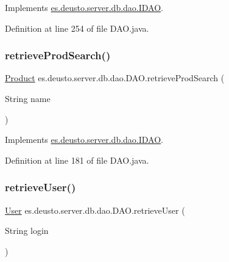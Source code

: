 Implements \hyperlink{interfacees_1_1deusto_1_1server_1_1db_1_1dao_1_1_i_d_a_o_a1386c2e329277fc36575b0450a0e8997}{es.\+deusto.\+server.\+db.\+dao.\+I\+D\+AO}.



Definition at line 254 of file D\+A\+O.\+java.

\mbox{\label{classes_1_1deusto_1_1server_1_1db_1_1dao_1_1_d_a_o_a5b4aa30073fdf9ea4263a86165ed4c18}} 
\subsubsection{\texorpdfstring{retrieve\+Prod\+Search()}{retrieveProdSearch()}}
{\footnotesize\ttfamily \hyperlink{classes_1_1deusto_1_1server_1_1db_1_1data_1_1_product}{Product} es.\+deusto.\+server.\+db.\+dao.\+D\+A\+O.\+retrieve\+Prod\+Search (\begin{DoxyParamCaption}\item[{String}]{name }\end{DoxyParamCaption})}



Implements \hyperlink{interfacees_1_1deusto_1_1server_1_1db_1_1dao_1_1_i_d_a_o_a9ba3fce5b0679bb1068484734fe0ed02}{es.\+deusto.\+server.\+db.\+dao.\+I\+D\+AO}.



Definition at line 181 of file D\+A\+O.\+java.

\mbox{\label{classes_1_1deusto_1_1server_1_1db_1_1dao_1_1_d_a_o_a8c316b4c3bf246d00fb2b423a603ebe6}} 
\subsubsection{\texorpdfstring{retrieve\+User()}{retrieveUser()}}
{\footnotesize\ttfamily \hyperlink{classes_1_1deusto_1_1server_1_1db_1_1data_1_1_user}{User} es.\+deusto.\+server.\+db.\+dao.\+D\+A\+O.\+retrieve\+User (\begin{DoxyParamCaption}\item[{String}]{login }\end{DoxyParamCaption})}



